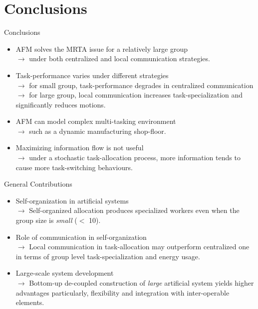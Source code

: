 \documentclass{beamer}
\begin{document}
\section{Conclusions}
\begin{frame}[t]{Conclusions}
\begin{itemize}
    \item \normalsize \alert{AFM solves the MRTA issue for a relatively large group}\\
    $\rightarrow$ \small under both centralized and local communication strategies.
    \item \normalsize \alert{Task-performance varies under different strategies}\\
    $\rightarrow$ \small for small group, task-performance degrades in centralized communication\\
    $\rightarrow$ \small for large group, local  communication increases task-specialization and significantly reduces motions.    
    \item \normalsize \alert{AFM can model complex multi-tasking environment}\\
    $\rightarrow$ \small such as a dynamic manufacturing shop-floor.
    \item \normalsize \alert{Maximizing information flow is not useful}\\
    $\rightarrow$ \small  under a stochastic task-allocation process, more information tends to cause more task-switching behaviours. %
 \end{itemize}
\end{frame}
\begin{frame}[t]{General Contributions}
%
\begin{itemize}
    \item \normalsize \alert{Self-organization in artificial systems}\\ 
$\rightarrow$ \small Self-organized allocation produces specialized workers even when the group size is \textit{small} ($<$ 10).
    \item \normalsize \alert{Role of communication in self-organization}\\
$\rightarrow$ \small  Local communication in task-allocation may outperform centralized one in terms of group level task-specialization and energy usage.
\item \normalsize \alert{Large-scale system development}\\
$\rightarrow$ \small Bottom-up de-coupled construction of \textit{large} artificial system yields higher advantages particularly, flexibility and integration with inter-operable elements.%
\end{itemize}
%
\end{frame}
\end{document}
